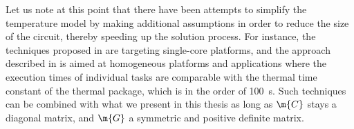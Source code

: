 Let us note at this point that there have been attempts to simplify the
temperature model by making additional assumptions in order to reduce the size
of the circuit, thereby speeding up the solution process. For instance, the
techniques proposed in \cite{bao2010, rai2011} are targeting single-core
platforms, and the approach described in \cite{rao2009} is aimed at homogeneous
platforms and applications where the execution times of individual tasks are
comparable with the thermal time constant of the thermal package, which is in
the order of 100~s. Such techniques can be combined with what we present in this
thesis as long as $\m{C}$ stays a diagonal matrix, and $\m{G}$ a symmetric and
positive definite matrix.
